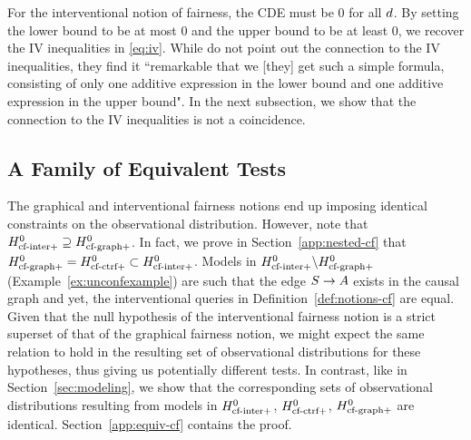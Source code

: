 \fi 
For the interventional notion of fairness, the CDE must be $0$ for all $d$. By setting the lower bound to be at most $0$ and the upper bound to be at least $0$, we recover the IV inequalities in \eqref{eq:iv}. While \citet{CaiKPT08} do not point out the connection to the IV inequalities, they find it ``remarkable that we [they] get such a simple formula, consisting of only one additive expression in the lower bound and one additive expression in the upper bound". In the next subsection, we show that the connection to the IV inequalities is not a coincidence.   

\subsection{A Family of Equivalent Tests}\label{subsec:equivalence}


The graphical and interventional fairness notions end up imposing identical constraints on the observational distribution.
However, note that $H^0_{\text{cf-inter}+} \supseteq H^0_{\text{cf-graph}+}$. In fact, we prove in Section~\ref{app:nested-cf} that $ H^0_{\text{cf-graph}+} = H^0_{\text{cf-ctrf}+} \subset H^0_{\text{cf-inter}+}$. Models in $H^0_{\text{cf-inter}+} \backslash H^0_{\text{cf-graph}+}$ (Example~\ref{ex:unconfexample}) are such that the edge $S \rightarrow A$ exists in the causal graph and yet, the interventional queries in Definition~\ref{def:notions-cf} are equal.
Given that the null hypothesis of the interventional fairness notion is a strict superset of that of the graphical fairness notion, we might expect the same relation to hold in the resulting set of observational distributions for these hypotheses, thus giving us potentially different tests. In contrast, like in Section~\ref{sec:modeling}, we show that the corresponding sets of observational distributions resulting from models in $H^0_{\text{cf-inter}+}$, $H^0_{\text{cf-ctrf}+}$, $H^0_{\text{cf-graph}+}$ are identical. Section~\ref{app:equiv-cf} contains the proof.

